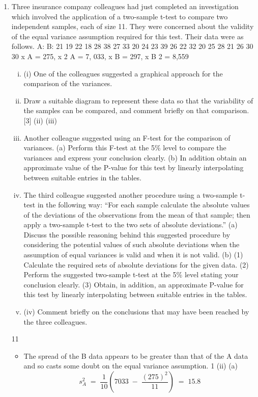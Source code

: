 \documentclass[a4paper,12pt]{article}
\begin{document}
\begin{enumerate}
\item Three insurance company colleagues had just completed an investigation which
involved the application of a two-sample t-test to compare two independent samples, each of size 11. They were concerned about the validity of the equal variance assumption required for this test. Their data were as follows.
A:
B:
21
19
22
18
28
38
27
33
20
24
23
39
26
22
32
20
25
28
21
26
30
30
\sigma  x A = 275, \sigma  x 2 A = 7, 033, \sigma  x B = 297, \sigma  x B 2 = 8,559
\begin{enumerate}[(i)]
\item (i)
One of the colleagues suggested a graphical approach for the comparison of the variances.
\item Draw a suitable diagram to represent these data so that the variability of the samples can be compared, and comment briefly on that comparison.
[3]
(ii)
(iii)
\item Another colleague suggested using an F-test for the comparison of variances.
(a) Perform this F-test at the 5\% level to compare the variances and express your conclusion clearly.
(b) In addition obtain an approximate value of the P-value for this test by linearly interpolating between suitable entries in the tables.
\item 
The third colleague suggested another procedure using a two-sample t-test in the following way:
“For each sample calculate the absolute values of the deviations of the observations from the mean of that sample;
then apply a two-sample t-test to the two sets of absolute deviations.”
(a) Discuss the possible reasoning behind this suggested procedure by considering the potential values of such absolute deviations when the assumption of equal variances is valid and when it is not valid.
(b) (1) Calculate the required sets of absolute deviations for the given
data.
(2) Perform the suggested two-sample t-test at the 5\% level stating your conclusion clearly.
(3) Obtain, in addition, an approximate P-value for this test by linearly interpolating between suitable entries in the tables.
\item (iv)
Comment briefly on the conclusions that may have been reached by the three
colleagues.
\end{enumerate}
\newpage

11
\begin{itemize}
(i)
Dotplots on same scale are most suitable
[alternatively boxplots or histograms are acceptable]
2
\item The spread of the B data appears to be greater than that of the A data and so casts some doubt on the equal variance assumption.
1
(ii)
(a)
\[s^2_A \;=\; \frac{1}{10} \left(7033  \;-\; \frac{(275)^2}{11}  \right) \;=\;15.8 \]


\end{itemize}
\end{enumerate}
\end{document}
